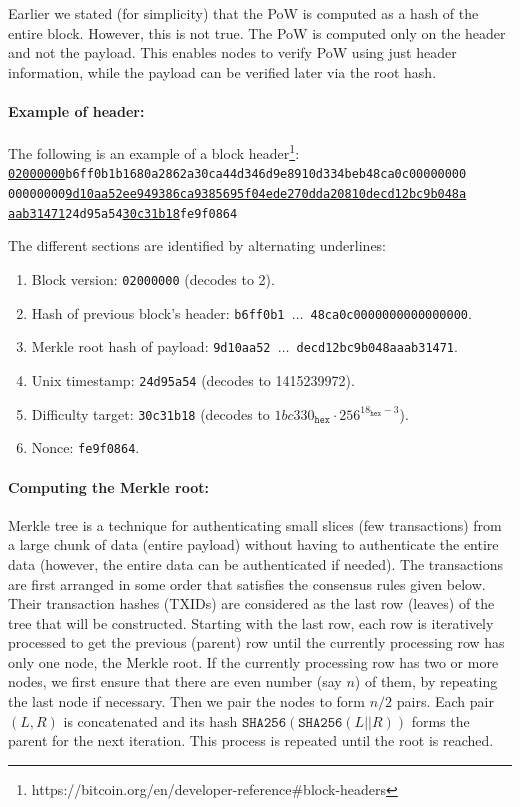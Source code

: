\documentclass[]{report}   %
\begin{document}
Earlier we stated (for simplicity) that the PoW is computed as a hash of the entire block. However, this is not true. The PoW is computed only on the header and not the payload. This enables nodes to verify PoW using just header information, while the payload can be verified later via the root hash. 

\paragraph{Example of header:} The following is an example of a block header\footnote{https://bitcoin.org/en/developer-reference\#block-headers}:\\
\texttt{\underline{02000000}b6ff0b1b1680a2862a30ca44d346d9e8910d334beb48ca0c00000000}\\
\texttt{00000000\underline{9d10aa52ee949386ca9385695f04ede270dda20810decd12bc9b048a}}\\
\texttt{\underline{aab31471}24d95a54\underline{30c31b18}fe9f0864}

The different sections are identified by alternating underlines:
\begin{enumerate}
	\item Block version: \texttt{02000000} (decodes to 2).
	\item Hash of previous block's header: \texttt{b6ff0b1 $\ldots$ 48ca0c0000000000000000}.
	\item Merkle root hash of payload: \texttt{9d10aa52 $\ldots$    decd12bc9b048aaab31471}.
	\item Unix timestamp: \texttt{24d95a54} (decodes to 1415239972).
	\item Difficulty target: \texttt{30c31b18} (decodes to $1bc330_{\texttt{hex}} \cdot 256^{18_{\texttt{hex}}-3}$).
	\item Nonce: \texttt{fe9f0864}.
\end{enumerate}
	
\paragraph{Computing the Merkle root:} Merkle tree is a technique for authenticating small slices (few transactions) from a large chunk of data (entire payload) without having to authenticate the entire data (however, the entire data can be authenticated if needed). The transactions are first arranged in some order that satisfies the consensus rules given below. Their transaction hashes (TXIDs) are considered as the last row (leaves) of the tree that will be constructed. Starting with the last row, each row is iteratively processed to get the previous (parent) row until the currently processing row has only one node, the Merkle root. 
If the currently processing row has two or more nodes, we first ensure that there are even number (say $n$) of them, by repeating the last node if necessary. Then we pair the nodes to form $n/2$ pairs. Each pair $(L, R)$ is concatenated and its hash $\texttt{SHA256}(\texttt{SHA256}(L||R))$ forms the parent for the next iteration. This process is repeated until the root is reached. 
\end{document}
